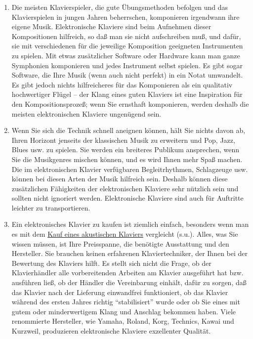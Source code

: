 \begin{enumerate}[label={\arabic*.}]
\item Die meisten Klavierspieler, die gute Übungsmethoden befolgen und das Klavierspielen in jungen Jahren beherrschen, komponieren irgendwann ihre eigene Musik.
Elektronische Klaviere sind beim Aufnehmen dieser Kompositionen hilfreich, so daß man sie nicht aufschreiben muß, und dafür, sie mit verschiedenen für die jeweilige Komposition geeigneten Instrumenten zu spielen.
Mit etwas zusätzlicher Software oder Hardware kann man ganze Symphonien komponieren und jedes Instrument selbst spielen.
Es gibt sogar Software, die Ihre Musik (wenn auch nicht perfekt) in ein Notat umwandelt.
Es gibt jedoch nichts hilfreicheres für das Komponieren als ein qualitativ hochwertiger Flügel -- der Klang eines guten Klaviers ist eine Inspiration für den Kompositionsprozeß; wenn Sie ernsthaft komponieren, werden deshalb die meisten elektronischen Klaviere ungenügend sein.

\item Wenn Sie sich die Technik schnell aneignen können, hält Sie nichts davon ab, Ihren Horizont jenseits der klassischen Musik zu erweitern und Pop, Jazz, Blues usw. zu spielen.
Sie werden ein breiteres Publikum ansprechen, wenn Sie die Musikgenres mischen können, und es wird Ihnen mehr Spaß machen.
Die im elektronischen Klavier verfügbaren Begleitrhythmen, Schlagzeuge usw. können bei diesen Arten der Musik hilfreich sein.
Deshalb können diese zusätzlichen Fähigkeiten der elektronischen Klaviere sehr nützlich sein und sollten nicht ignoriert werden.
Elektronische Klaviere sind auch für Auftritte leichter zu transportieren.

\item Ein elektronisches Klavier zu kaufen ist ziemlich einfach, besonders wenn man es mit dem \hyperref[c1iii17e]{Kauf eines akustischen Klaviers} vergleicht (s.u.).
Alles, was Sie wissen müssen, ist Ihre Preisspanne, die benötigte Ausstattung und den Hersteller.
Sie brauchen keinen erfahrenen Klaviertechniker, der Ihnen bei der Bewertung des Klaviers hilft.
Es stellt sich nicht die Frage, ob der Klavierhändler alle vorbereitenden Arbeiten am Klavier ausgeführt hat bzw. ausführen ließ, ob der Händler die Vereinbarung einhält, dafür zu sorgen, daß das Klavier nach der Lieferung einwandfrei funktioniert, ob das Klavier während des ersten Jahres richtig \enquote{stabilisiert} wurde oder ob Sie eines mit gutem oder minderwertigem Klang und Anschlag bekommen haben.
Viele renommierte Hersteller, wie Yamaha, Roland, Korg, Technics, Kawai und Kurzweil, produzieren elektronische Klaviere exzellenter Qualität.


\end{enumerate}
